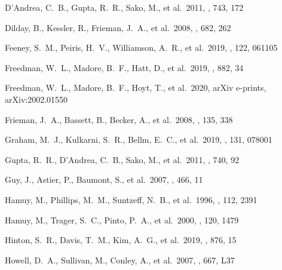 \documentclass[]{aa} %
\begin{document}
\begin{thebibliography}{}


 D'Andrea, C.~B., Gupta, R.~R., Sako, M., et al.\ 2011, \apj, 743, 172

 Dilday, B., Kessler, R., Frieman, J.~A., et al.\ 2008, \apj, 682, 262


 Feeney, S.~M., Peiris, H.~V., Williamson, A.~R., et al.\ 2019, \prl, 122, 061105

 Freedman, W.~L., Madore, B.~F., Hatt, D., et al.\ 2019, \apj, 882, 34

 Freedman, W.~L., Madore, B.~F., Hoyt, T., et al.\ 2020, arXiv e-prints, arXiv:2002.01550



 Frieman, J.~A., Bassett, B., Becker, A., et al.\ 2008, \aj, 135, 338


 Graham, M.~J., Kulkarni, S.~R., Bellm, E.~C., et al.\ 2019, \pasp, 131, 078001

 Gupta, R.~R., D'Andrea, C.~B., Sako, M., et al.\ 2011, \apj, 740, 92

 Guy, J., Astier, P., Baumont, S., et al.\ 2007, \aap, 466, 11



 Hamuy, M., Phillips, M.~M., Suntzeff, N.~B., et al.\ 1996, \aj, 112, 2391

 Hamuy, M., Trager, S.~C., Pinto, P.~A., et al.\ 2000, \aj, 120, 1479

 Hinton, S.~R., Davis, T.~M., Kim, A.~G., et al.\ 2019, \apj, 876, 15


 Howell, D.~A., Sullivan, M., Conley, A., et al.\ 2007, \apjl, 667, L37



\end{thebibliography}
\end{document}
